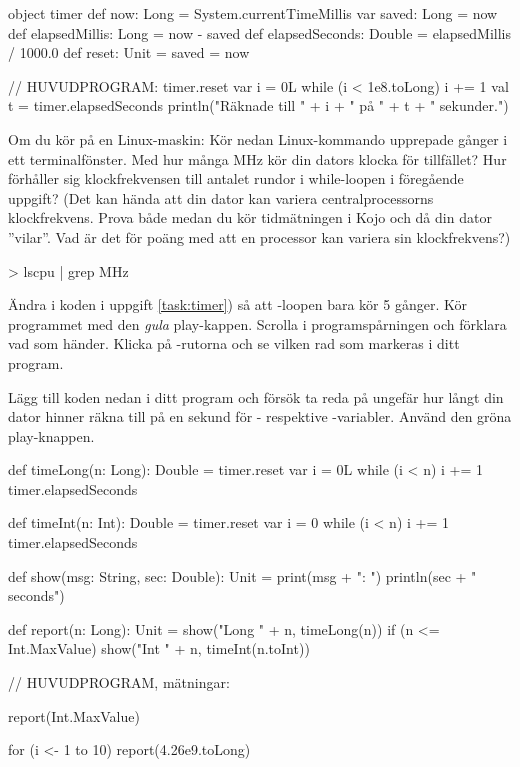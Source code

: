 \begin{Code}
object timer {
  def now: Long = System.currentTimeMillis
  var saved: Long = now
  def elapsedMillis: Long = now - saved
  def elapsedSeconds: Double = elapsedMillis / 1000.0
  def reset: Unit = { saved = now }
}

// HUVUDPROGRAM:
timer.reset
var i = 0L
while (i < 1e8.toLong) { i += 1 }
val t = timer.elapsedSeconds
println("Räknade till " + i + " på " + t + " sekunder.")
\end{Code}

\Subtask  Om du kör på en Linux-maskin: Kör nedan Linux-kommando upprepade gånger i ett terminalfönster. Med hur många MHz kör din dators klocka för tillfället? Hur förhåller sig klockfrekvensen till antalet rundor i while-loopen i föregående uppgift? (Det kan hända att din dator kan variera centralprocessorns klockfrekvens. Prova både medan du kör tidmätningen i Kojo och då din dator ''vilar''. Vad är det för poäng med att en processor kan variera sin klockfrekvens?)
\begin{REPL}
> lscpu | grep MHz
\end{REPL}


\Subtask Ändra i koden i uppgift \ref{task:timer}) så att -loopen bara kör 5 gånger. Kör programmet med den \emph{gula} play-kappen. Scrolla i programspårningen och förklara vad som händer. Klicka på -rutorna och se vilken rad som markeras i ditt program.

\Subtask Lägg till koden nedan i ditt program och försök ta reda på ungefär hur långt din dator hinner räkna till på en sekund för - respektive -variabler. Använd den gröna play-knappen.
\begin{Code}
def timeLong(n: Long): Double = {
  timer.reset
  var i = 0L
  while (i < n) { i += 1 }
  timer.elapsedSeconds
}

def timeInt(n: Int): Double = {
  timer.reset
  var i = 0
  while (i < n) { i += 1 }
  timer.elapsedSeconds
}

def show(msg: String, sec: Double): Unit = {
  print(msg + ": ")
  println(sec + " seconds")
}

def report(n: Long): Unit = {
  show("Long " + n, timeLong(n))
  if (n <= Int.MaxValue) show("Int  " + n, timeInt(n.toInt))
}

// HUVUDPROGRAM, mätningar:

report(Int.MaxValue)

for (i <- 1 to 10) {
  report(4.26e9.toLong)
}
\end{Code}

